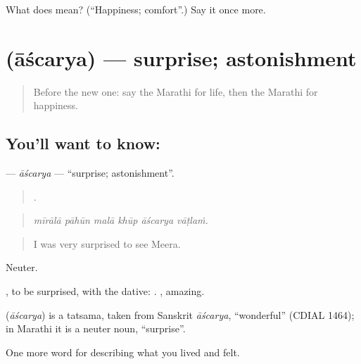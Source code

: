 \begin{tcolorbox}[breakable,colback=teal!4,colframe=teal!35!black,title={Before you move on}]
What does  mean? (\textquotedblleft{}Happiness; comfort\textquotedblright{}.) Say it once more.
\end{tcolorbox}
\section[\texorpdfstring{\mr{आश्चर्य} (āścarya)}{आश्चर्य (āścarya)}]{ (āścarya) — surprise; astonishment}

\label{lesson:MR-C450-ascarya}



\begin{quote}
Before the new one: say the Marathi for life, then the Marathi for happiness.
\end{quote}

\subsection*{You'll want to know: }
\textbf{} — \emph{āścarya} — \textquotedblleft{}surprise; astonishment\textquotedblright{}.

\begin{quote}
     .
\end{quote}

\begin{quote}
\emph{mīrālā pāhūn malā khūp āścarya vāṭlaṁ.}
\end{quote}

\begin{quote}
I was very surprised to see Meera.
\end{quote}

Neuter.

 , to be surprised, with the dative:   . , amazing.

\begin{cousinweb}
\textbf{} (\emph{āścarya}) is a tatsama, taken from Sanskrit \emph{āścarya}, \textquotedblleft{}wonderful\textquotedblright{} (CDIAL 1464); in Marathi it is a neuter noun, \textquotedblleft{}surprise\textquotedblright{}.
\end{cousinweb}

\begin{grammarlens}[title={What you've built}]
One more word for describing what you lived and felt.
\end{grammarlens}

